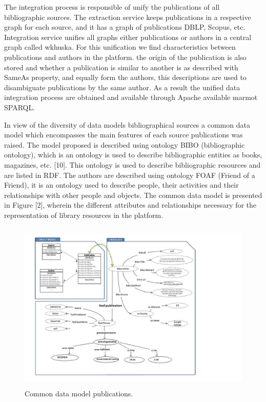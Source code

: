 \documentclass[11pt]{article}
\begin{document}
The integration process is responsible of unify the publications of all bibliographic sources. The extraction service keeps publications in a respective graph for each source, and it has a graph of publications DBLP, Scopus, etc. Integration service unifies all graphs either publications or authors in a central graph called wkhuska. For this unification we find characteristics between publications and authors in the platform. the origin of the publication is also stored and whether a publication is similar to another is as described with  SameAs  property, and equally form  the authors, this descriptions are used to disambiguate publications by the same author. As a result the unified data integration process are obtained and available through Apache available marmot SPARQL.
 

In view of the diversity of data models bibliographical sources a common data model which encompasses the main features of each source publications was raised. The model proposed is described using ontology BIBO (bibliographic ontology), which is an ontology is used to describe bibliographic entities as books, magazines, etc. [10]. This ontology is used to describe bibliographic resources and are listed in RDF. The authors are described using ontology FOAF (Friend of a Friend), it is an ontology used to describe people, their activities and their relationships with other people and objects. The common data model is presented in Figure [2], wherein the different attributes and relationships necessary for the representation of library resources in the platform.

 \begin{figure}[ht!]
	\centering
		\includegraphics[height=8.2cm]{dataModelCommon.png}
	\caption{Common data model publications.}
	\label{fig:Escudo2}
\end{figure}
\end{document}
